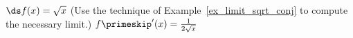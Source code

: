 {$\ds f(x)=\sqrt{x}$ (Use the technique of Example~\ref{ex_limit_sqrt_conj} to compute the necessary limit.)
}
{$f\primeskip'(x) = \frac{1}{2\sqrt{x}}$}
